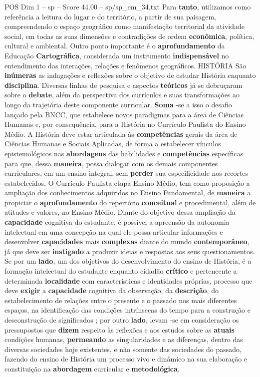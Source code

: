 \begin{textsample}{POS Dim 1 – sp – Score 44.00 – sp/sp\_em\_34.txt}
Para \textbf{tanto}, utilizamos como referência a leitura do lugar e do território, a partir de sua paisagem, compreendendo o espaço geográfico como manifestação territorial da atividade social, em todas as suas dimensões e contradições de ordem \textbf{econômica}, política, cultural e ambiental.
Outro ponto importante é o \textbf{aprofundamento} da Educação \textbf{Cartográfica}, considerada um instrumento \textbf{indispensável} no entendimento das interações, relações e fenômenos geográficos.
HISTÓRIA São \textbf{inúmeras} as indagações e reflexões sobre o objetivo de estudar História enquanto \textbf{disciplina}.
Diversas linhas de pesquisa e aspectos \textbf{teóricos} já se debruçaram sobre o \textbf{debate}, além da perspectiva dos currículos e suas transformações ao longo da trajetória deste componente curricular. \textbf{Soma} -se a isso o desafio lançado pela BNCC, que estabelece novos paradigmas para a área de Ciências Humanas e, por consequência, para a História no Currículo Paulista do Ensino Médio.
A História deve estar articulada às \textbf{competências} gerais da área de Ciências Humanas e Sociais Aplicadas, de forma a estabelecer vínculos epistemológicos nas \textbf{abordagens} das habilidades e \textbf{competências} específicas para que, dessa \textbf{maneira}, possa dialogar com os demais componentes curriculares, em um ensino integral, sem \textbf{perder} sua especificidade nos recortes estabelecidos.
O Currículo Paulista etapa Ensino Médio, tem como proposição a ampliação dos conhecimentos adquiridos no Ensino Fundamental, de \textbf{maneira} a propiciar o \textbf{aprofundamento} do repertório \textbf{conceitual} e procedimental, além de atitudes e valores, no Ensino Médio.
Diante do objetivo dessa ampliação da \textbf{capacidade} cognitiva do estudante, é possível a apreensão da autonomia intelectual em uma concepção na qual ele possa articular informações e desenvolver \textbf{capacidades} mais \textbf{complexas} diante do mundo \textbf{contemporâneo}, já que deve ser \textbf{instigado} a produzir ideias e respostas aos seus questionamentos.
Se por um \textbf{lado}, um dos objetivos do desenvolvimento do ensino de História, é a formação intelectual do estudante enquanto cidadão \textbf{crítico} e pertencente a determinada \textbf{localidade} com características e identidades próprias, processo que deve \textbf{exigir} a \textbf{capacidade} cognitiva da observação, da \textbf{descrição}, do estabelecimento de relações entre o presente e o passado nos mais diferentes espaços, na identificação das condições intrínsecas do tempo para a construção e desconstrução de significados ; por outro \textbf{lado}, levam -se em consideração os pressupostos que \textbf{dizem} respeito às reflexões e aos estudos sobre as \textbf{atuais} condições humanas, \textbf{permeando} as singularidades e as diferenças, dentro das diversas sociedades hoje existentes, e não somente das sociedades do passado, fazendo do ensino de História um processo vivo e dinâmico na sua elaboração e constituição na \textbf{abordagem} curricular e \textbf{metodológica}.

\end{textsample}
